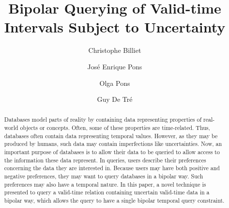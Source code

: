 \documentclass[runningheads,a4paper]{llncs}
\begin{document}
\mainmatter  %

\title{Bipolar Querying of Valid-time Intervals Subject to Uncertainty}


\author{Christophe Billiet \and Jos\'{e} Enrique Pons \and Olga Pons \and Guy De Tr\'{e}}



\maketitle


\begin{abstract}
Databases model parts of reality by containing data representing properties of real-world objects or concepts. Often, some of these properties are time-related. Thus, databases often contain data representing temporal values. However, as they may be produced by humans, such data may contain imperfections like uncertainties. Now, an important purpose of databases is to allow their data to be queried to allow access to the information these data represent. In queries, users describe their preferences concerning the data they are interested in. Because users may have both positive and negative preferences, they may want to query databases in a bipolar way. Such preferences may also have a temporal nature. In this paper, a novel technique is presented to query a valid-time relation containing uncertain valid-time data in a bipolar way, which allows the query to have a single bipolar temporal query constraint.

\end{abstract}
\end{document}
